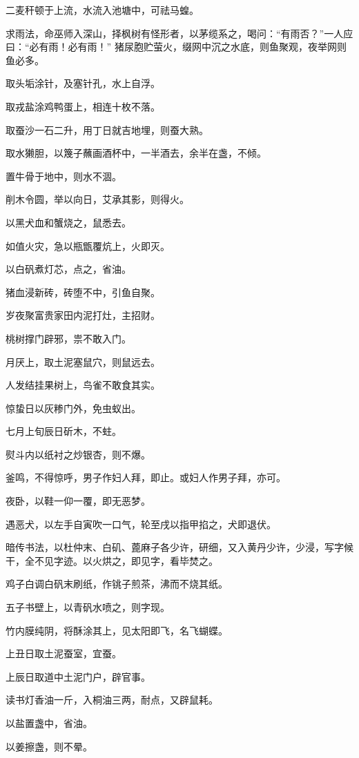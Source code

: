\documentclass[a4paper,12pt,UTF8,twoside]{ctexbook}
\begin{document}
    二麦秆顿于上流，水流入池塘中，可祛马蝗。
    
    求雨法，命巫师入深山，择枫树有怪形者，以茅缆系之，喝问：“有雨否？”一人应曰：“必有雨！必有雨！” 猪尿胞贮萤火，缀网中沉之水底，则鱼聚观，夜举网则鱼必多。
    
    取头垢涂针，及塞针孔，水上自浮。
    
    取戎盐涂鸡鸭蛋上，相连十枚不落。
    
    取蚕沙一石二升，用丁日就吉地埋，则蚕大熟。
    
    取水獭胆，以篾子蘸画酒杯中，一半酒去，余半在盏，不倾。
    
    置牛骨于地中，则水不涸。
    
    削木令圆，举以向日，艾承其影，则得火。
    
    以黑犬血和蟹烧之，鼠悉去。
    
    如值火灾，急以瓶甑覆炕上，火即灭。
    
    以白矾煮灯芯，点之，省油。
    
    猪血浸新砖，砖堕不中，引鱼自聚。
    
    岁夜聚富贵家田内泥打灶，主招财。
    
    桃树撑门辟邪，祟不敢入门。
    
    月厌上，取土泥塞鼠穴，则鼠远去。
    
    人发结挂果树上，鸟雀不敢食其实。
    
    惊蛰日以灰糁门外，免虫蚁出。
    
    七月上旬辰日斫木，不蛀。
    
    熨斗内以纸衬之炒银杏，则不爆。
    
    釜鸣，不得惊呼，男子作妇人拜，即止。或妇人作男子拜，亦可。
    
    夜卧，以鞋一仰一覆，即无恶梦。
    
    遇恶犬，以左手自寅吹一口气，轮至戌以指甲掐之，犬即退伏。
    
    暗传书法，以杜仲末、白矶、蓖麻子各少许，研细，又入黄丹少许，少浸，写字候干，全不见字迹。以火烘之，即见字，看毕焚之。
    
    鸡子白调白矾末刷纸，作铫子煎茶，沸而不烧其纸。
    
    五子书壁上，以青矾水喷之，则字现。
    
    竹内膜纯阴，将酥涂其上，见太阳即飞，名飞蝴蝶。
    
    上丑日取土泥蚕室，宜蚕。
    
    上辰日取道中土泥门户，辟官事。
    
    读书灯香油一斤，入桐油三两，耐点，又辟鼠耗。
    
    以盐置盏中，省油。
    
    以姜擦盏，则不晕。
    
\end{document}

